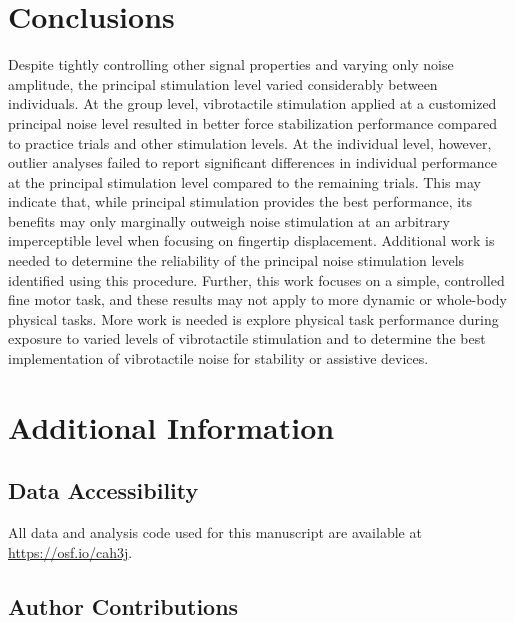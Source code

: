 \documentclass[]{cik}%
\begin{document}
\hypertarget{conclusions}{%
\section{Conclusions}\label{conclusions}}

Despite tightly controlling other signal properties and varying only
noise amplitude, the principal stimulation level varied considerably
between individuals. At the group level, vibrotactile stimulation
applied at a customized principal noise level resulted in better force
stabilization performance compared to practice trials and other
stimulation levels. At the individual level, however, outlier analyses
failed to report significant differences in individual performance at
the principal stimulation level compared to the remaining trials. This
may indicate that, while principal stimulation provides the best
performance, its benefits may only marginally outweigh noise stimulation
at an arbitrary imperceptible level when focusing on fingertip
displacement. Additional work is needed to determine the reliability of
the principal noise stimulation levels identified using this procedure.
Further, this work focuses on a simple, controlled fine motor task, and
these results may not apply to more dynamic or whole-body physical
tasks. More work is needed is explore physical task performance during
exposure to varied levels of vibrotactile stimulation and to determine
the best implementation of vibrotactile noise for stability or assistive
devices.

\newpage

\hypertarget{additional-information}{%
\section{Additional Information}\label{additional-information}}

\hypertarget{data-accessibility}{%
\subsection{Data Accessibility}\label{data-accessibility}}

All data and analysis code used for this manuscript are available at
\url{https://osf.io/cah3j}.

\hypertarget{author-contributions}{%
\subsection{Author Contributions}\label{author-contributions}}
\end{document}
